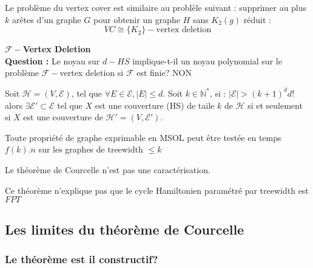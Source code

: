 \documentclass[a4paper, 11pt]{thesis}
\begin{document}


Le problème du vertex cover est similaire au problèle suivant : supprimer au plus $k$ arêtes d'un
graphe $G$ pour obtenir un graphe $H$ sans $K_2(g)$ réduit :
\begin{displaymath}
VC \cong \{K_2\}-\mbox{vertex deletion}
\end{displaymath}

\textbf{$\mathcal{F}-$Vertex Deletion}\\

\textbf{Question :} Le noyau sur $d-HS$ implique-t-il un noyau polynomial sur le problème
$\mathcal{F}-$vertex deletion si $\mathcal{F}$ est finie? NON

\begin{lemma}
    Soit $\mathcal{H} = (V, \mathcal{E})$, tel que $\forall E \in \mathcal{E}, |E| \leq d$. Soit $k
    \in \mathbb{N}^*$, si : $|\mathcal{E}| > (k+1)^d d!$ alors $\exists \mathcal{E}' \subset
    \mathcal{E}$ tel que $X$ est une couverture (HS) de taile $k$ de $\mathcal{H}$ si et seulement
    si $X$ est une couverture de $\mathcal{H}' = (V, \mathcal{E}')$.
\end{lemma}


\begin{thrm}[Courcelle]
    Toute propriété de graphe exprimable en MSOL peut être testée en temps $f(k).n$ sur les graphes
    de treewidth $\leq k$
\end{thrm}

\begin{rq}
    Le théorème de Courcelle n'est pas une caractérisation.
\end{rq}

\begin{ex}
    Ce théorème n'explique pas que le cycle Hamiltonien paramétré par treewidth est $FPT$
\end{ex}

\subsection{Les limites du théorème de Courcelle}

\subsubsection{Le théorème est il constructif?}
\end{document}

